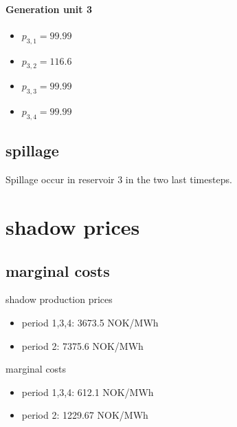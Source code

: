 \documentclass{article}
\begin{document}
\paragraph{Generation unit 3}
\begin{itemize}
\item $p_{3,1}=99.99$
\item $p_{3,2}=116.6$
\item $p_{3,3}=99.99$
\item $p_{3,4}=99.99$
\end{itemize}
\subsection{spillage}
Spillage occur in reservoir 3 in the two last timesteps.

\section{shadow prices}
\subsection{marginal costs}
shadow production prices
\begin{itemize}
\item period 1,3,4: 3673.5 NOK/MWh
\item period 2: 7375.6 NOK/MWh
\end{itemize}
marginal costs
\begin{itemize}
\item period 1,3,4: 612.1 NOK/MWh
\item period 2: 1229.67 NOK/MWh
\end{itemize}
\end{document}
